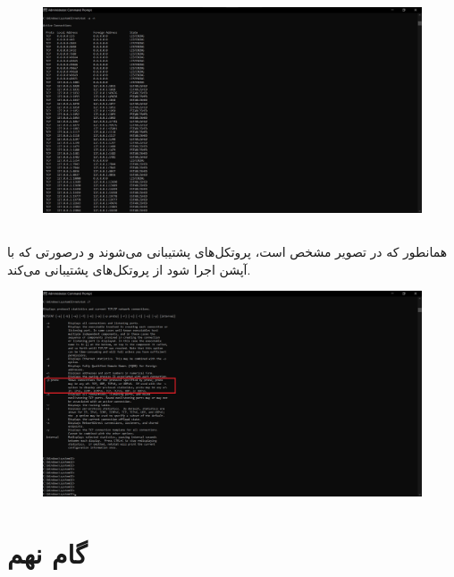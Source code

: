 \documentclass{article}
\begin{document}
\subsection{}
\begin{figure}[H]
    \centering
    \includegraphics[width=1.0\textwidth]{figures/8.2.jpg}
    \caption
	{
	}
    \label{fig:fig1}
\end{figure}

\subsection{}
همانطور که در تصویر مشخص است، پروتکل‌های  پشتیبانی می‌شوند و درصورتی که با آپشن  اجرا شود از پروتکل‌های  پشتیبانی می‌کند.
\begin{figure}[H]
    \centering
    \includegraphics[width=1.0\textwidth]{figures/8.3.jpg}
    \caption
	{
	}
    \label{fig:fig1}
\end{figure}

\section{گام نهم}
\end{document}
